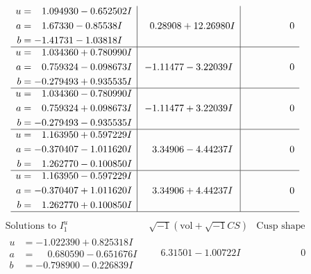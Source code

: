\documentclass[1p]{elsarticle_modified}
\theoremstyle{definition}
\newcommand{\I}{\sqrt{-1}}
\begin{document}
$$\begin{array}{c|c|c}
\begin{aligned}
u &= \phantom{-}1.094930 - 0.652502 I \\
a &= \phantom{-}1.67330 - 0.85538 I \\
b &= -1.41731 - 1.03818 I\end{aligned}
 & \phantom{-}0.28908 + 12.26980 I & \phantom{-0.000000 } 0 \\ \hline\begin{aligned}
u &= \phantom{-}1.034360 + 0.780990 I \\
a &= \phantom{-}0.759324 - 0.098673 I \\
b &= -0.279493 + 0.935535 I\end{aligned}
 & -1.11477 - 3.22039 I & \phantom{-0.000000 } 0 \\ \hline\begin{aligned}
u &= \phantom{-}1.034360 - 0.780990 I \\
a &= \phantom{-}0.759324 + 0.098673 I \\
b &= -0.279493 - 0.935535 I\end{aligned}
 & -1.11477 + 3.22039 I & \phantom{-0.000000 } 0 \\ \hline\begin{aligned}
u &= \phantom{-}1.163950 + 0.597229 I \\
a &= -0.370407 - 1.011620 I \\
b &= \phantom{-}1.262770 - 0.100850 I\end{aligned}
 & \phantom{-}3.34906 - 4.44237 I & \phantom{-0.000000 } 0 \\ \hline\begin{aligned}
u &= \phantom{-}1.163950 - 0.597229 I \\
a &= -0.370407 + 1.011620 I \\
b &= \phantom{-}1.262770 + 0.100850 I\end{aligned}
 & \phantom{-}3.34906 + 4.44237 I & \phantom{-0.000000 } 0\\
 \hline 
 \end{array}$$\newpage$$\begin{array}{c|c|c}  
\text{Solutions to }I^u_{1}& \I (\text{vol} + \sqrt{-1}CS) & \text{Cusp shape}\\
 \hline 
\begin{aligned}
u &= -1.022390 + 0.825318 I \\
a &= \phantom{-}0.680590 - 0.651676 I \\
b &= -0.798900 - 0.226839 I\end{aligned}
 & \phantom{-}6.31501 - 1.00722 I & \phantom{-0.000000 } 0 \\ \hline\begin{aligned}

\end{aligned}
\end{array}$$
\end{document}
